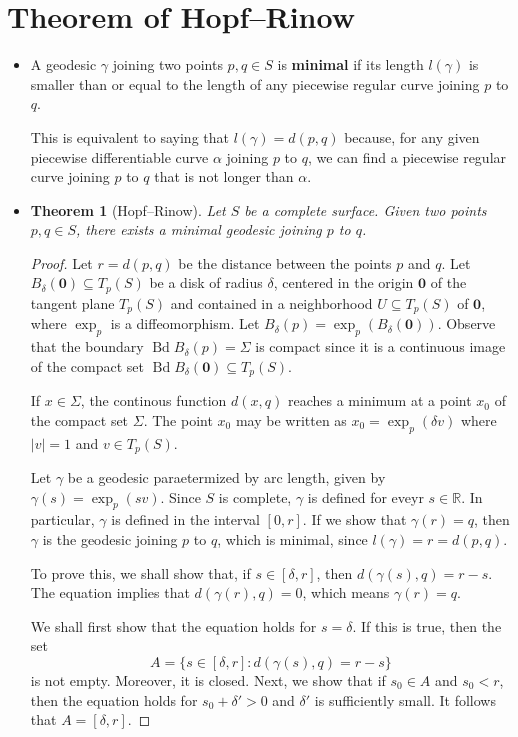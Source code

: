 \documentclass[10pt]{article}
\newtheorem{theorem}[lemma]{Theorem}
\newcommand{\ve}[1]{\mathbf{#1}}
\newcommand{\Real}{\mathbb{R}}
\newcommand{\sseq}{\subseteq}
\DeclareMathOperator{\Bd}{Bd}
\begin{document}
  \section{Theorem of Hopf--Rinow}
  \begin{itemize}
    \item A geodesic $\gamma$ joining two points $p, q \in S$ is {\bf minimal} if its length $l(\gamma)$ is smaller than or equal to the length of any piecewise regular curve joining $p$ to $q$.

    This is equivalent to saying that $l(\gamma) = d(p,q)$ because, for any given piecewise differentiable curve $\alpha$ joining $p$ to $q$, we can find a piecewise regular curve joining $p$ to $q$ that is not longer than $\alpha$.

    \item \begin{theorem}[Hopf--Rinow]
      Let $S$ be a complete surface. Given two points $p, q \in S$, there exists a minimal geodesic joining $p$ to $q$.
    \end{theorem}
    \begin{proof}
      Let $r = d(p,q)$ be the distance between the points $p$ and $q$. Let $B_{\delta}(\ve{0}) \sseq T_p(S)$ be a disk of radius $\delta$, centered in the origin $\ve{0}$ of the tangent plane $T_p(S)$ and contained in a neighborhood $U \sseq T_p(S)$ of $\ve{0}$, where $\exp_p$ is a diffeomorphism. Let $B_\delta(p) = \exp_p(B_\delta(\ve{0}))$. Observe that the boundary $\Bd B_\delta(p) = \Sigma$ is compact since it is a continuous image of the compact set $\Bd B_\delta(\ve{0}) \sseq T_p(S).$

      If $x \in \Sigma$, the continous function $d(x,q)$ reaches a minimum at a point $x_0$ of the compact set $\Sigma$. The point $x_0$ may be written as $x_0 = \exp_p(\delta v)$ where $|v| = 1$ and $v \in T_p(S)$.

      Let $\gamma$ be a geodesic paraetermized by arc length, given by $\gamma(s) = \exp_p(sv)$. Since $S$ is complete, $\gamma$ is defined for eveyr $s \in \Real$. In particular, $\gamma$ is defined in the interval $[0,r]$. If we show that $\gamma(r) = q$, then $\gamma$ is the geodesic joining $p$ to $q$, which is minimal, since $l(\gamma) = r = d(p,q)$.

      To prove this, we shall show that, if $s \in [\delta, r]$, then $d(\gamma(s), q) = r - s$. The equation implies that $d(\gamma(r), q) = 0$, which means $\gamma(r) = q$.

      We shall first show that the equation holds for $s = \delta$. If this is true, then the set $$A = \{ s \in [ \delta, r] : d(\gamma(s), q) = r - s \}$$ is not empty. Moreover, it is closed. Next, we show that if $s_0 \in A$ and $s_0 < r$, then the equation holds for $s_0 + \delta' > 0$ and $\delta'$ is sufficiently small. It follows that $A = [\delta, r]$.


\end{proof}
\end{itemize}
\end{document}
